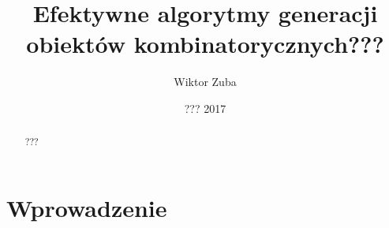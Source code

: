 \documentclass{pracamgr}
\author{Wiktor Zuba}
\title{Efektywne algorytmy generacji obiektów kombinatorycznych???}
\date{??? 2017}
\begin{document}
\maketitle

\begin{abstract}
???
\end{abstract}


\tableofcontents%

 \chapter*{Wprowadzenie}
  
\end{document}
